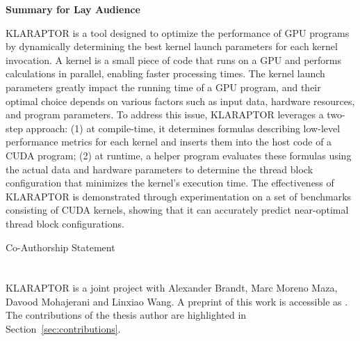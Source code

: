 \documentclass[12pt,twoside]{report}
\makeatletter
\numberwithin{figure}{chapter}
\newenvironment{preliminary}%
{\pagestyle{plain}\pagenumbering{roman}}%
{\pagenumbering{arabic}}
\newcommand\coauthor[1]{%
  \edef\@tempa{#1}%
  \def\@tempb{}%
  \ifx\@tempa\@tempb
	\else \newpage \Large Co-Authorship Statement\normalsize\\\indent\\#1\\
  \fi
}
\newcommand{\makecoauthor}{
%
}
\makeatother
\begin{document}
\begin{preliminary}
\Large\begin{center}\textbf{Summary for Lay Audience}\end{center}\normalsize
KLARAPTOR is a tool designed to optimize the performance 
of GPU programs by dynamically determining the best kernel launch parameters for each kernel invocation. 
A kernel is a small piece of code that runs on a GPU and performs calculations in parallel, enabling 
faster processing times. The kernel launch parameters greatly impact the running time of a GPU program, 
and their optimal choice depends on various factors such as input data, hardware resources, and program 
parameters. To address this issue, KLARAPTOR leverages a two-step approach: (1) at compile-time, it 
determines formulas describing low-level performance metrics for each kernel and inserts them into the 
host code of a CUDA program; (2) at runtime, a helper program evaluates these formulas using the actual 
data and hardware parameters to determine the thread block configuration that minimizes the kernel's execution 
time. The effectiveness of KLARAPTOR is demonstrated through experimentation on a set of benchmarks consisting
of CUDA kernels, showing that it can accurately predict near-optimal thread block configurations.
\newpage
{}
\coauthor{\makecoauthor}  %
KLARAPTOR is a joint project with Alexander Brandt, Marc Moreno Maza, Davood Mohajerani 
and Linxiao Wang. A preprint of this work is accessible as \cite{DBLP:journals/corr/abs-1911-02373}. 
The contributions of the thesis author are highlighted in Section~\ref{sec:contributions}.
\newpage
\tableofcontents\newpage
\newpage
{}
\listoffigures\newpage
\newpage
{}
\listoftables
\newpage
{}
\listofmyappendices
\newpage
\end{preliminary}


\end{document}

